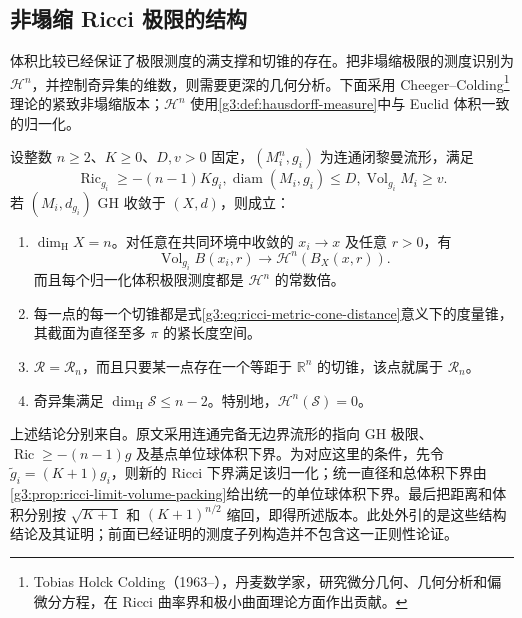 \subsection{非塌缩 Ricci 极限的结构}
\label{g3:subsec:2903:04}
体积比较已经保证了极限测度的满支撑和切锥的存在。把非塌缩极限的测度识别为 \(\mathcal H^n\)，并控制奇异集的维数，则需要更深的几何分析。下面采用 Cheeger--Colding\footnote{Tobias Holck Colding（1963--），丹麦数学家，研究微分几何、几何分析和偏微分方程，在 Ricci 曲率界和极小曲面理论方面作出贡献。}理论的紧致非塌缩版本；\(\mathcal H^n\) 使用\cref{g3:def:hausdorff-measure}中与 Euclid 体积一致的归一化。

\begin{theorem}\label{g3:thm:cheeger-colding-noncollapsed}
	设整数 \(n\ge2\)、\(K\ge0\)、\(D,v>0\) 固定，\((M_i^n,g_i)\) 为连通闭黎曼流形，满足
	\[
		\operatorname{Ric}_{g_i}\ge-(n-1)Kg_i,
		\operatorname{diam}(M_i,g_i)\le D,
		\operatorname{Vol}_{g_i}M_i\ge v.
	\]
	若 \((M_i,d_{g_i})\) GH 收敛于 \((X,d)\)，则成立：
	\begin{enumerate}
		\item \(\dim_{\mathrm H}X=n\)。对任意在共同环境中收敛的 \(x_i\to x\) 及任意 \(r>0\)，有
		\begin{equation}\label{g3:eq:noncollapsed-volume-convergence}
			\operatorname{Vol}_{g_i}B(x_i,r)
			\longrightarrow\mathcal H^n(B_X(x,r)).
		\end{equation}
		而且每个归一化体积极限测度都是 \(\mathcal H^n\) 的常数倍。
		\item 每一点的每一个切锥都是式\eqref{g3:eq:ricci-metric-cone-distance}意义下的度量锥，其截面为直径至多 \(\pi\) 的紧长度空间。
		\item \(\mathcal R=\mathcal R_n\)，而且只要某一点存在一个等距于 \(\mathbb R^n\) 的切锥，该点就属于 \(\mathcal R_n\)。
		\item 奇异集满足 \(\dim_{\mathrm H}\mathcal S\le n-2\)。特别地，\(\mathcal H^n(\mathcal S)=0\)。
	\end{enumerate}
\end{theorem}

上述结论分别来自\cite[定理5.9和5.11，第434页；定理5.2，第432--433页；定理6.1，第435--437页]{CheegerColding1997StructureI}。原文采用连通完备无边界流形的指向 GH 极限、\(\operatorname{Ric}\ge-(n-1)g\) 及基点单位球体积下界。为对应这里的条件，先令 \(\widetilde g_i=(K+1)g_i\)，则新的 Ricci 下界满足该归一化；统一直径和总体积下界由\cref{g3:prop:ricci-limit-volume-packing}给出统一的单位球体积下界。最后把距离和体积分别按 \(\sqrt{K+1}\) 和 \((K+1)^{n/2}\) 缩回，即得所述版本。此处外引的是这些结构结论及其证明；前面已经证明的测度子列构造并不包含这一正则性论证。

